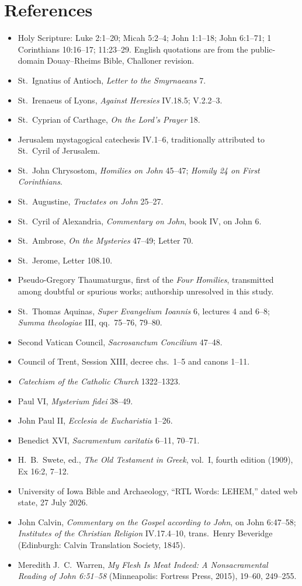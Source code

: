\section{References}
\begin{itemize}
\item Holy Scripture: Luke 2:1--20; Micah 5:2--4; John 1:1--18; John 6:1--71;
1 Corinthians 10:16--17; 11:23--29. English quotations are from the
public-domain Douay--Rheims Bible, Challoner revision.
\item St.\ Ignatius of Antioch, \emph{Letter to the Smyrnaeans} 7.
\item St.\ Irenaeus of Lyons, \emph{Against Heresies} IV.18.5; V.2.2--3.
\item St.\ Cyprian of Carthage, \emph{On the Lord's Prayer} 18.
\item Jerusalem mystagogical catechesis IV.1--6, traditionally attributed to
St.\ Cyril of Jerusalem.
\item St.\ John Chrysostom, \emph{Homilies on John} 45--47; \emph{Homily 24 on
First Corinthians}.
\item St.\ Augustine, \emph{Tractates on John} 25--27.
\item St.\ Cyril of Alexandria, \emph{Commentary on John}, book IV, on John 6.
\item St.\ Ambrose, \emph{On the Mysteries} 47--49; Letter 70.
\item St.\ Jerome, Letter 108.10.
\item Pseudo-Gregory Thaumaturgus, first of the \emph{Four Homilies}, transmitted
among doubtful or spurious works; authorship unresolved in this study.
\item St.\ Thomas Aquinas, \emph{Super Evangelium Ioannis} 6, lectures 4 and
6--8; \emph{Summa theologiae} III, qq.\ 75--76, 79--80.
\item Second Vatican Council, \emph{Sacrosanctum Concilium} 47--48.
\item Council of Trent, Session XIII, decree chs.\ 1--5 and canons 1--11.
\item \emph{Catechism of the Catholic Church} 1322--1323.
\item Paul VI, \emph{Mysterium fidei} 38--49.
\item John Paul II, \emph{Ecclesia de Eucharistia} 1--26.
\item Benedict XVI, \emph{Sacramentum caritatis} 6--11, 70--71.
\item H.\ B.\ Swete, ed., \emph{The Old Testament in Greek}, vol.\ I, fourth
edition (1909), Ex 16:2, 7--12.
\item University of Iowa Bible and Archaeology, ``RTL Words: LEHEM,'' dated web
state, 27 July 2026.
\item John Calvin, \emph{Commentary on the Gospel according to John}, on John
6:47--58; \emph{Institutes of the Christian Religion} IV.17.4--10, trans.\
Henry Beveridge (Edinburgh: Calvin Translation Society, 1845).
\item Meredith J.\ C.\ Warren, \emph{My Flesh Is Meat Indeed: A
Nonsacramental Reading of John 6:51--58} (Minneapolis: Fortress Press, 2015),
19--60, 249--255.
\end{itemize}


